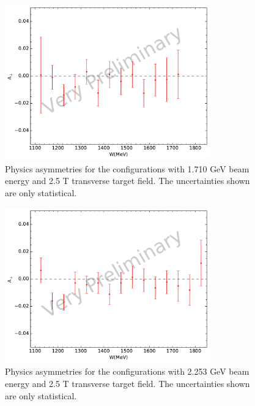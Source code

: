 \begin{figure}[p!]
  \centering
  \includegraphics[width=0.79\textwidth]{figs/asymmetry-17102590.pdf}
  \caption[Physics asymmetries with $E=1.710$ GeV and $B=2.5$ T.]{Physics asymmetries for the configurations with 1.710 GeV beam energy and 2.5 T transverse target field. The uncertainties shown are only statistical. \label{C8S1F2}}
\end{figure}

\begin{figure}[p!]
  \centering
  \includegraphics[width=0.79\textwidth]{figs/asymmetry-22532590.pdf}
  \caption[Physics asymmetries with $E=2.253$ GeV and $B=2.5$ T.]{Physics asymmetries for the configurations with 2.253 GeV beam energy and 2.5 T transverse target field. The uncertainties shown are only statistical. \label{C8S1F3}}
\end{figure}

